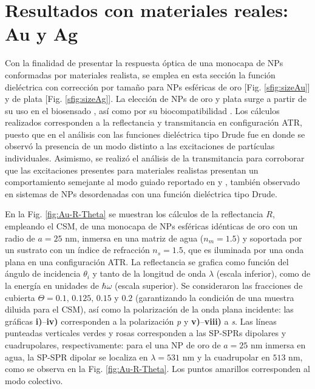 \section{Resultados con materiales reales: Au y Ag}
\label{section:AuAg}

Con la finalidad de presentar la respuesta óptica de una monocapa de NPs conformadas por materiales realista, se emplea en esta sección la función dieléctrica con corrección por tamaño para NPs esféricas de oro [Fig. \ref{sfig:sizeAu}] y de plata [Fig. \ref{sfig:sizeAg}]. La elección de NPs de oro y plata surge a partir de su uso en el biosensado \cite{jain2008noble}, así como por su biocompatibilidad \cite{fan2009bio,bosetti2002silver}. Los cálculos realizados corresponden a la reflectancia y transmitancia en configuración ATR, puesto que en el análisis con las funciones dieléctrica tipo Drude fue en donde se observó la presencia de un modo distinto a las excitaciones de partículas individuales. Asimismo, se realizó el análisis de la transmitancia para corroborar que las excitaciones presentes para materiales realistas presentan un comportamiento semejante al modo guiado reportado en \cite{kabashin2009plasmonic} y \cite{danilov2018ultra}, también observado en sistemas de NPs desordenadas con una función dieléctrica tipo Drude.

En la Fig.  \ref{fig:Au-R-Theta} se muestran los cálculos de la reflectancia $R$, empleando el CSM, de una monocapa de NPs esféricas idénticas de oro con un radio de $a = 25$ nm, inmersa en una matriz de agua ($n_m = 1.5$) y soportada por un sustrato con un índice de refracción $n_s = 1.5$, que es iluminada por una onda plana en una configuración ATR. La reflectancia se grafica como función del ángulo de incidencia $\theta_i$ y tanto de la longitud de onda $\lambda$ (escala inferior), como de la energía en unidades de $\hbar\omega$ (escala superior). Se consideraron las fracciones de cubierta $\Theta = 0.1,\,0.125,\,0.15$ y $0.2$  (garantizando la condición de una muestra diluida para el CSM), así como la polarización de la onda plana incidente: las gráficas \textbf{i)}--\textbf{iv)} corresponden a la polarización \emph{p} y \textbf{v)}--\textbf{viii)} a \emph{s}. Las líneas punteadas verticales verdes y rosas corresponden a las SP-SPRs dipolares y cuadrupolares, respectivamente: para el una NP de oro de $a= 25$ nm inmersa en agua, la SP-SPR dipolar se localiza en $\lambda = 531$ nm y la cuadrupolar en $513$ nm, como se observa en la Fig. \ref{fig:Au-R-Theta}. Los puntos amarillos corresponden al modo colectivo.


